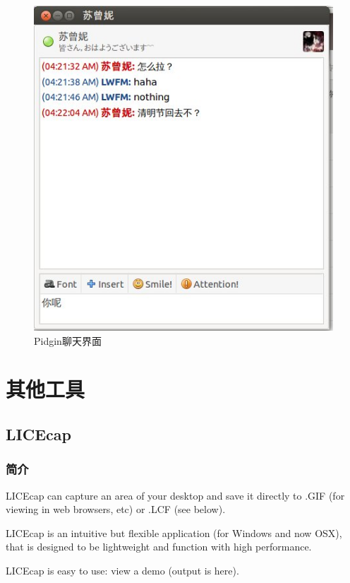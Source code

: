 \documentclass[paper=a4,fontsize=11pt]{article}
\begin{document}
	\begin{figure}[htbp]
		\centering
		\includegraphics[scale=0.8]{PidginWebQQTalking.jpeg}
		\caption{Pidgin聊天界面}
		\label{PidginWebQQTalking}
	\end{figure}	
	
	\section{其他工具}
	
	\subsection{LICEcap}
	
	\subsubsection{简介}
	
	LICEcap can capture an area of your desktop and save it directly to .GIF (for viewing in web browsers, etc) or .LCF (see below). 
	
	LICEcap is an intuitive but flexible application (for Windows and now OSX), that is designed to be lightweight and function with high performance. 
	
	LICEcap is easy to use: view a demo (output is here). 
	
\end{document}
